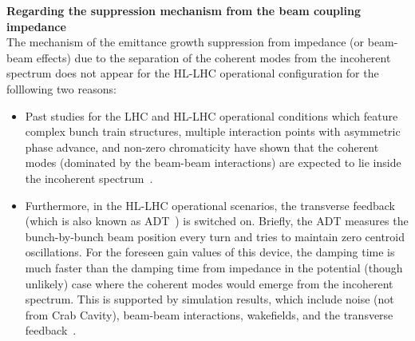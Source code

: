 \textbf{Regarding the suppression mechanism from the beam coupling impedance}\\
The mechanism of the emittance growth suppression from impedance (or beam-beam effects) due to the separation of the coherent modes from the incoherent spectrum does not appear for the HL-LHC operational configuration for the folllowing two reasons:
\begin{itemize}
   \item Past studies for the LHC and HL-LHC operational conditions which feature complex bunch train structures, multiple interaction points with asymmetric phase advance, and non-zero chromaticity have shown that the coherent modes (dominated by the beam-beam interactions) are expected to lie inside the incoherent spectrum~\cite{Pieloni:1259906, Buffat:2712068}.
   \item Furthermore, in the HL-LHC operational scenarios, the transverse feedback (which is also known as ADT~\cite{lhc_adt_info_presentation}) is switched on. Briefly, the ADT measures the bunch-by-bunch beam position every turn and tries to maintain zero centroid oscillations. For the foreseen gain values of this device, the damping time is much faster than the damping time from impedance in the potential (though unlikely) case where the coherent modes would emerge from the incoherent spectrum. This is supported by simulation results, which include noise (not from Crab Cavity), beam-beam interactions, wakefields, and the transverse feedback~\cite{Buffat:2712068}.
\end{itemize}





